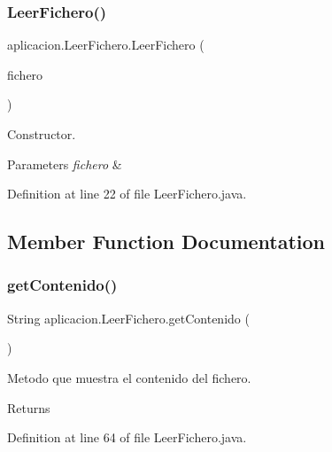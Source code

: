 \subsubsection{\texorpdfstring{Leer\+Fichero()}{LeerFichero()}}
{\footnotesize\ttfamily aplicacion.\+Leer\+Fichero.\+Leer\+Fichero (\begin{DoxyParamCaption}\item[{File\+Reader}]{fichero }\end{DoxyParamCaption})}

Constructor. 
\begin{DoxyParams}{Parameters}
{\em fichero} & \\
\hline
\end{DoxyParams}


Definition at line 22 of file Leer\+Fichero.\+java.



\subsection{Member Function Documentation}
\hypertarget{classaplicacion_1_1_leer_fichero_a1bbd72cd2d98a81cc7ebabae57465e7f}{}\label{classaplicacion_1_1_leer_fichero_a1bbd72cd2d98a81cc7ebabae57465e7f} 
\subsubsection{\texorpdfstring{get\+Contenido()}{getContenido()}}
{\footnotesize\ttfamily String aplicacion.\+Leer\+Fichero.\+get\+Contenido (\begin{DoxyParamCaption}{ }\end{DoxyParamCaption})}

Metodo que muestra el contenido del fichero. \begin{DoxyReturn}{Returns}

\end{DoxyReturn}


Definition at line 64 of file Leer\+Fichero.\+java.

\hypertarget{classaplicacion_1_1_leer_fichero_ac85026646b27dee1b9dd2d28eaa4ae59}{}\label{classaplicacion_1_1_leer_fichero_ac85026646b27dee1b9dd2d28eaa4ae59} 
